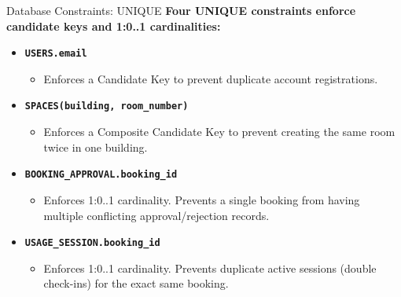 \begin{frame}{Database Constraints: UNIQUE}
    \textbf{Four UNIQUE constraints enforce candidate keys and 1:0..1 cardinalities:}
    \vspace{0.3cm}
    
    \begin{itemize}
        \item \textbf{\texttt{USERS.email}}
        \begin{itemize}
            \item Enforces a Candidate Key to prevent duplicate account registrations.
        \end{itemize}
        \vspace{0.2cm}
        \item \textbf{\texttt{SPACES(building, room\_number)}}
        \begin{itemize}
            \item Enforces a Composite Candidate Key to prevent creating the same room twice in one building.
        \end{itemize}
        \vspace{0.2cm}
        \item \textbf{\texttt{BOOKING\_APPROVAL.booking\_id}}
        \begin{itemize}
            \item Enforces 1:0..1 cardinality. Prevents a single booking from having multiple conflicting approval/rejection records.
        \end{itemize}
        \vspace{0.2cm}
        \item \textbf{\texttt{USAGE\_SESSION.booking\_id}}
        \begin{itemize}
            \item Enforces 1:0..1 cardinality. Prevents duplicate active sessions (double check-ins) for the exact same booking.
        \end{itemize}
    \end{itemize}
\end{frame}
